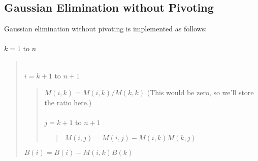 \documentclass[10pt]{article}
\begin{document}
\subsection{Gaussian Elimination without Pivoting}\label{gewp}
\noindent Gaussian elimination without pivoting is implemented as follows: \\ \\
 $k = 1$ to $n$
\begin{quote}
 \\
 $i = k+1$ to $n+1$
\begin{quote}
\noindent $M\left(i,k\right) = M\left(i,k\right)/M\left(k,k\right)$ (This would be zero, so we'll store the ratio here.) \\
 \\
 $j = k+1$ to $n+1$
\begin{quote}
\noindent $M\left(i,j\right) = M\left(i,j\right) - M\left(i,k\right) M\left(k,j\right)$
\end{quote}
\end{quote}
\noindent $B\left(i\right) = B\left(i\right) - M\left(i,k\right) B\left(k\right)$ \\
\end{quote}
\end{document}
